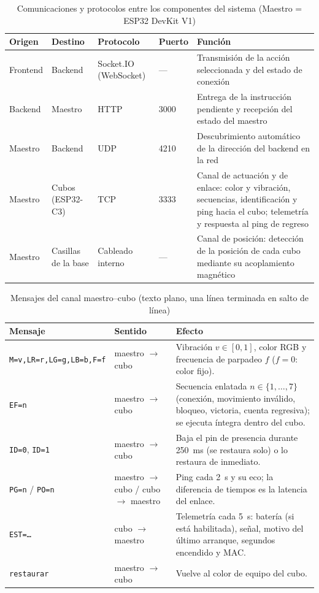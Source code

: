 \documentclass{book}
\begin{document}
\begin{table}[H]
\centering
\caption{Comunicaciones y protocolos entre los componentes del sistema
(Maestro = ESP32 DevKit V1)}
\label{tab:comunicaciones-sistema}
\renewcommand{\arraystretch}{1.3}
\begin{tabular}{|p{1.7cm}|p{1.9cm}|p{2.3cm}|p{1.0cm}|p{2.7cm}|}
\hline
\textbf{Origen} & \textbf{Destino} & \textbf{Protocolo} & \textbf{Puerto} & \textbf{Función} \\
\hline
Frontend & Backend & Socket.IO (WebSocket) & --- & Transmisión de la acción seleccionada y del estado de conexión \\
\hline
Backend & Maestro & HTTP & 3000 & Entrega de la instrucción pendiente y recepción del estado del maestro \\
\hline
Maestro & Backend & UDP & 4210 & Descubrimiento automático de la dirección del backend en la red \\
\hline
Maestro & Cubos (ESP32-C3) & TCP & 3333 & Canal de actuación y de enlace: color y vibración, secuencias, identificación y ping hacia el cubo; telemetría y respuesta al ping de regreso \\
\hline
Maestro & Casillas de la base & Cableado interno & --- & Canal de posición: detección de la posición de cada cubo mediante su acoplamiento magnético \\
\hline
\end{tabular}
\end{table}

\begin{table}[H]
\centering
\caption{Mensajes del canal maestro--cubo (texto plano, una línea terminada en salto de línea)}
\label{tab:mensajes-cubo}
\renewcommand{\arraystretch}{1.3}
\begin{tabular}{|p{3.7cm}|p{1.7cm}|p{5.0cm}|}
\hline
\textbf{Mensaje} & \textbf{Sentido} & \textbf{Efecto} \\
\hline
\texttt{M=v,LR=r,}\allowbreak\texttt{LG=g,LB=b,}\allowbreak\texttt{F=f} & maestro $\rightarrow$ cubo & Vibración $v\in[0,1]$, color RGB y frecuencia de parpadeo $f$ ($f=0$: color fijo). \\
\hline
\texttt{EF=n} & maestro $\rightarrow$ cubo & Secuencia enlatada $n\in\{1,\dots,7\}$ (conexión, movimiento inválido, bloqueo, victoria, cuenta regresiva); se ejecuta íntegra dentro del cubo. \\
\hline
\texttt{ID=0}, \texttt{ID=1} & maestro $\rightarrow$ cubo & Baja el pin de presencia durante 250~ms (se restaura solo) o lo restaura de inmediato. \\
\hline
\texttt{PG=n} / \texttt{PO=n} & maestro $\rightarrow$ cubo / cubo $\rightarrow$ maestro & Ping cada 2~s y su eco; la diferencia de tiempos es la latencia del enlace. \\
\hline
\texttt{EST=\dots} & cubo $\rightarrow$ maestro & Telemetría cada 5~s: batería (si está habilitada), señal, motivo del último arranque, segundos encendido y MAC. \\
\hline
\texttt{restaurar} & maestro $\rightarrow$ cubo & Vuelve al color de equipo del cubo. \\
\hline
\end{tabular}
\end{table}
\end{document}
